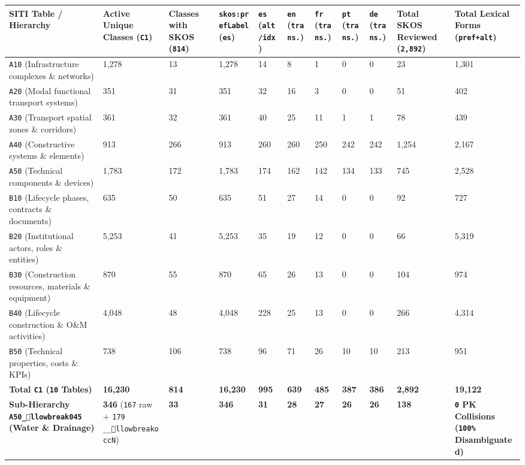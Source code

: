 \documentclass[10pt,a4paper]{article}
\begin{document}
{\scriptsize
\begin{longtable}{p{}p{}p{}p{}p{}p{}p{}p{}p{}p{}p{}}
\toprule
\textbf{SITI Table / Hierarchy} & \textbf{Active Unique Classes (\texttt{C1})} & \textbf{Classes with SKOS (\texttt{814})} & \textbf{\texttt{skos:prefLabel} (\texttt{es})} & \textbf{\texttt{es} (\texttt{alt/idx})} & \textbf{\texttt{en} (\texttt{trans.})} & \textbf{\texttt{fr} (\texttt{trans.})} & \textbf{\texttt{pt} (\texttt{trans.})} & \textbf{\texttt{de} (\texttt{trans.})} & \textbf{Total SKOS Reviewed (\texttt{2,892})} & \textbf{Total Lexical Forms (\texttt{pref+alt})} \\
\midrule
\endhead
\texttt{A10} (Infrastructure complexes \& networks) & 1,278 & 13 & 1,278 & 14 & 8 & 1 & 0 & 0 & 23 & 1,301 \\
\texttt{A20} (Modal functional transport systems) & 351 & 31 & 351 & 32 & 16 & 3 & 0 & 0 & 51 & 402 \\
\texttt{A30} (Transport spatial zones \& corridors) & 361 & 32 & 361 & 40 & 25 & 11 & 1 & 1 & 78 & 439 \\
\texttt{A40} (Constructive systems \& elements) & 913 & 266 & 913 & 260 & 260 & 250 & 242 & 242 & 1,254 & 2,167 \\
\texttt{A50} (Technical components \& devices) & 1,783 & 172 & 1,783 & 174 & 162 & 142 & 134 & 133 & 745 & 2,528 \\
\texttt{B10} (Lifecycle phases, contracts \& documents) & 635 & 50 & 635 & 51 & 27 & 14 & 0 & 0 & 92 & 727 \\
\texttt{B20} (Institutional actors, roles \& entities) & 5,253 & 41 & 5,253 & 35 & 19 & 12 & 0 & 0 & 66 & 5,319 \\
\texttt{B30} (Construction resources, materials \& equipment) & 870 & 55 & 870 & 65 & 26 & 13 & 0 & 0 & 104 & 974 \\
\texttt{B40} (Lifecycle construction \& O\&M activities) & 4,048 & 48 & 4,048 & 228 & 25 & 13 & 0 & 0 & 266 & 4,314 \\
\texttt{B50} (Technical properties, costs \& KPIs) & 738 & 106 & 738 & 96 & 71 & 26 & 10 & 10 & 213 & 951 \\
\textbf{Total \texttt{C1} (\texttt{10} Tables)} & \textbf{16,230} & \textbf{814} & \textbf{16,230} & \textbf{995} & \textbf{639} & \textbf{485} & \textbf{387} & \textbf{386} & \textbf{2,892} & \textbf{19,122} \\
\textbf{Sub-Hierarchy \texttt{A50\_llowbreak{}045} (Water \& Drainage)} & \textbf{346} (\texttt{167} raw + \texttt{179} \texttt{\_\_llowbreak{}occN}) & \textbf{33} & \textbf{346} & \textbf{31} & \textbf{28} & \textbf{27} & \textbf{26} & \textbf{26} & \textbf{138} & \textbf{\texttt{0} PK Collisions (\texttt{100\%} Disambiguated)} \\
\bottomrule
\end{longtable}
}
\end{document}

